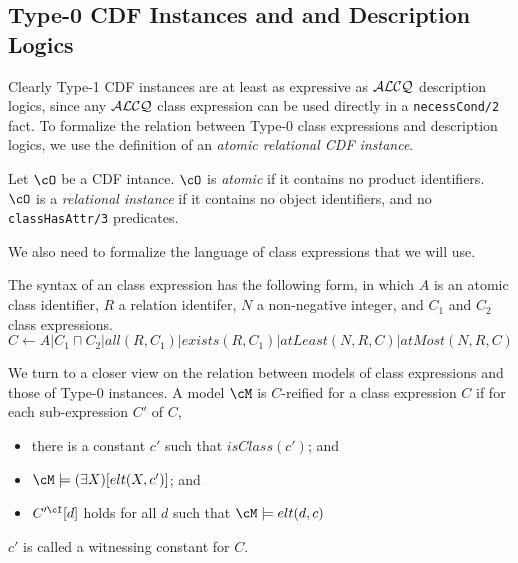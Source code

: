 \subsection{Type-0 CDF Instances and and Description Logics}
\label{sec:comp} 

Clearly Type-1 CDF instances are at least as expressive as ${\cal
ALCQ}$ description logics, since any ${\cal ALCQ}$ class expression
can be used directly in a {\tt necessCond/2} fact.  To formalize the
relation between Type-0 class expressions and description logics, we
use the definition of an {\em atomic relational CDF instance}.
\begin{definition}
Let $\cO$ be a CDF intance.  $\cO$ is {\em atomic} if it contains no
product identifiers.  $\cO$ is a {\em relational instance} if it
contains no object identifiers, and no {\tt classHasAttr/3}
predicates.
\end{definition}

We also need to formalize the language of class expressions that we
will use.

\begin{definition}
The syntax of an \omsdl{} class expression has the following form, in
which $A$ is an atomic class identifier, $R$ a relation identifer, $N$
a non-negative integer, and $C_1$ and $C_2$ \omsdl{} class expressions.
\[ C \leftarrow A | C_1 \sqcap C_2 | all(R,C_1) | exists(R,C_1) 
	| atLeast(N,R,C) | atMost(N,R,C) \]
\end{definition}


We turn to a closer view on the relation between models of class
expressions and those of Type-0 instances.  A model $\cM$ is
$C$-reified for a class expression $C$ if for each sub-expression $C'$
of $C$,
\begin{itemize}
\item there is a constant $c'$ such that $isClass(c')$;  and 
\item $\cM \models (\exists X)[elt(X,c')]$;  and 
\item $C'^{\cI}[d]$ holds for all $d$ such that $\cM \models elt(d,c)$
\end{itemize}
$c'$ is called a witnessing constant for $C$.

